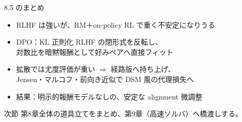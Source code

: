 \asmain
\begin{frame}{8.5 のまとめ}
    \begin{itemize}
        \item RLHF は強いが、RM＋on-policy RL で重く不安定になりうる
        \item DPO：KL 正則化 RLHF の閉形式を反転し、\\
        対数比を暗黙報酬として好みペアへ直接フィット
        \item 拡散では尤度評価が重い $\Rightarrow$ 経路版へ持ち上げ、\\
        Jensen・マルコフ・前向き近似で DSM 風の代理損失へ
        \item 結果：明示的報酬モデルなしの、安定な alignment 微調整
    \end{itemize}
    \begin{alertblock}{次節}
        第8章全体の道具立てをまとめ、第9章（高速ソルバ）へ橋渡しする。
    \end{alertblock}
\end{frame}
